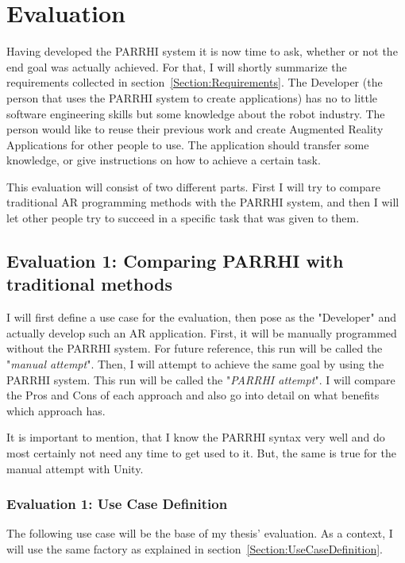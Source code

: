 \chapter{Evaluation}\label{Chap:Evaluation}

Having developed the PARRHI system it is now time to ask, whether or not the end goal was actually achieved. For that, I will shortly summarize the requirements collected in section~\ref{Section:Requirements}. The Developer (the person that uses the PARRHI system to create applications) has no to little software engineering skills but some knowledge about the robot industry. The person would like to reuse their previous work and create Augmented Reality Applications for other people to use. The application should transfer some knowledge, or give instructions on how to achieve a certain task.

This evaluation will consist of two different parts. First I will try to compare traditional AR programming methods with the PARRHI system, and then I will let other people try to succeed in a specific task that was given to them. 

\section{Evaluation 1: Comparing PARRHI with traditional methods}

I will first define a use case for the evaluation, then pose as the "Developer" and actually develop such an AR application. First, it will be manually programmed without the PARRHI system. For future reference, this run will be called the "\textit{manual attempt}". Then, I will attempt to achieve the same goal by using the PARRHI system. This run will be called the "\textit{PARRHI attempt}". I will compare the Pros and Cons of each approach and also go into detail on what benefits which approach has.

It is important to mention, that I know the PARRHI syntax very well and do most certainly not need any time to get used to it. But, the same is true for the manual attempt with Unity.

\subsection{Evaluation 1: Use Case Definition}
The following use case will be the base of my thesis' evaluation. As a context, I will use the same factory as explained in section~\ref{Section:UseCaseDefinition}. 

